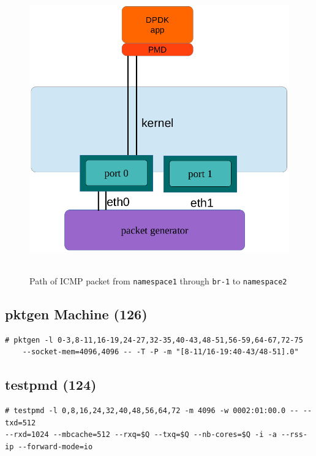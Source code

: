 \documentclass[letter]{article}
\begin{document}
{{{\begin{figure}[H]
\caption{Path of ICMP packet from \texttt{namespace1} through \texttt{br-1} to \texttt{namespace2}}
\hbox{\hspace{-0.5cm} \includegraphics[scale=0.6]{i-o-1-port} }
\end{figure}

\subsection{pktgen Machine (126)}

\begin{lstlisting}
# pktgen -l 0-3,8-11,16-19,24-27,32-35,40-43,48-51,56-59,64-67,72-75 
	--socket-mem=4096,4096 -- -T -P -m "[8-11/16-19:40-43/48-51].0"
\end{lstlisting}

\subsection{testpmd (124)}

\begin{lstlisting}[escapechar=!]
# testpmd -l 0,8,16,24,32,40,48,56,64,72 -m 4096 -w 0002:01:00.0 -- --txd=512 
--rxd=1024 --mbcache=512 --rxq=$Q --txq=$Q --nb-cores=$Q -i -a --rss-ip --forward-mode=io
\end{lstlisting}

}}}
\end{document}
